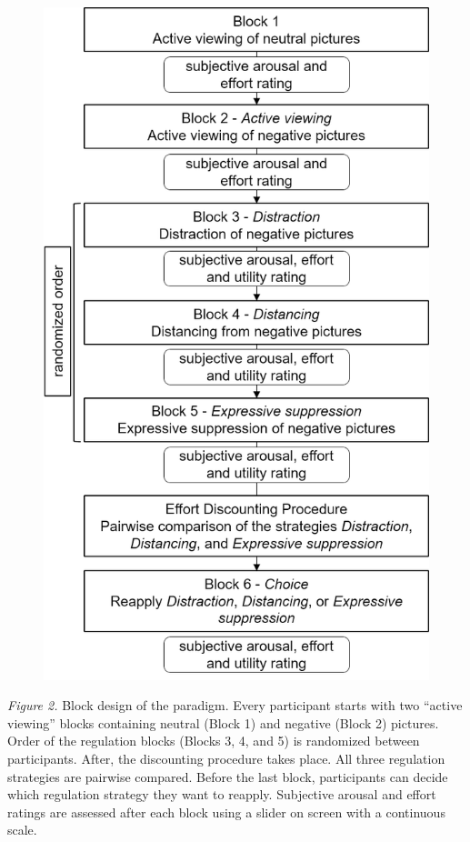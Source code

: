 \documentclass[
  man,floatsintext]{apa6}
\begin{document}
\begin{figure}[H]
\includegraphics[width=\textwidth]{figures/Design_ER-ED} \caption{ }\label{fig:DesignEREDappendix}
\end{figure}

\emph{Figure 2.} Block design of the paradigm.
Every participant starts with two ``active viewing'' blocks containing neutral (Block 1) and negative (Block 2) pictures.
Order of the regulation blocks (Blocks 3, 4, and 5) is randomized between participants.
After, the discounting procedure takes place.
All three regulation strategies are pairwise compared.
Before the last block, participants can decide which regulation strategy they want to reapply.
Subjective arousal and effort ratings are assessed after each block using a slider on screen with a continuous scale.
\end{document}
